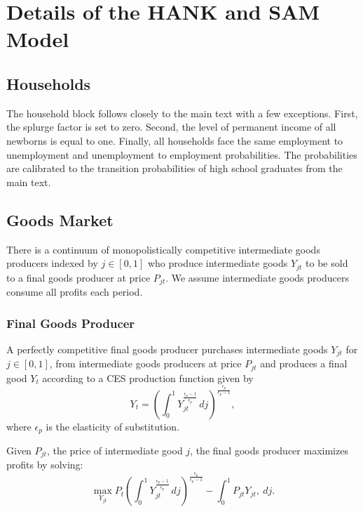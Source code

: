 \documentclass[\econtexRoot/HAFiscal]{subfiles}
\begin{document}
	
\FloatBarrier
\hypertarget{hank_appendix}{}\par\section{Details of the HANK and SAM Model}
\notinsubfile{\label{sec:hank_appendix}}


\subsection{Households}

The household block follows closely to the main text with a few exceptions. First, the splurge factor is set to zero. Second, the level of permanent income of all newborns is equal to one. Finally, all households face the same employment to unemployment and unemployment to employment probabilities. The probabilities are calibrated to the transition probabilities of high school graduates from the main text.


\subsection{Goods Market}

There is a continuum of  monopolistically competitive intermediate goods producers indexed by $j \in [0,1]$ who produce intermediate goods $Y_{jt}$ to be sold to a final goods producer at price $P_{jt}$. We assume intermediate goods producers consume all profits each period.  

\subsubsection{Final Goods Producer}

A perfectly competitive final goods producer purchases intermediate goods $Y_{jt}$ for $j \in [0,1]$, from intermediate goods producers at price $P_{jt}$ and produces a final good $Y_{t}$ according to a CES production function given by 
$$ Y_{t} = \left(\int_{0}^{1} Y_{jt}^{\frac{\epsilon_{p}-1}{\epsilon_{p}}}\, dj\right)^{\frac{\epsilon_{p}}{\epsilon_{p}-1}},$$ 
where $\epsilon_{p}$ is the elasticity of substitution.

Given $P_{jt}$, the price of intermediate good $j$, the final goods producer maximizes profits by solving:
$$ \max_{Y_{jt}} P_{t} \left(\int_{0}^{1} Y_{jt}^{\frac{\epsilon_{p}-1}{\epsilon_{p}}}\, dj\right)^{\frac{\epsilon_{p}}{\epsilon_{p}-1}} - \int_{0}^{1} P_{jt} Y_{jt} ,\ dj.$$ 
\end{document}
